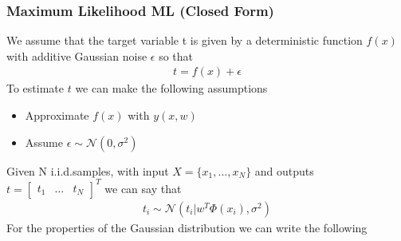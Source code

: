 \documentclass[../main.tex]{subfiles}
\begin{document}
\subsubsection{Maximum Likelihood ML (Closed Form)}
We assume that the target variable t is given by a deterministic function
$f(x)$ with additive Gaussian noise $\epsilon$ so that
\begin{align*}
    t=f(x)+\epsilon
\end{align*}
To estimate $t$ we can make the following assumptions
\begin{itemize}
    \item Approximate $f(x)$ with $y(x,w)$
    \item Assume $\epsilon\sim\mathcal{N}(0, \sigma^2)$
\end{itemize}
Given N i.i.d.\footnotemark samples, with input $X=\{x_1,...,x_N\}$ and outputs $t=\begin{bmatrix} t_1 & \dots & t_N\end{bmatrix}^T$ we can say that
\begin{align}
    t_i\sim \mathcal{N}(t_i|w^T\Phi(x_i),\sigma^2)
\end{align}
For the properties of the Gaussian distribution we can write the following
\end{document}

